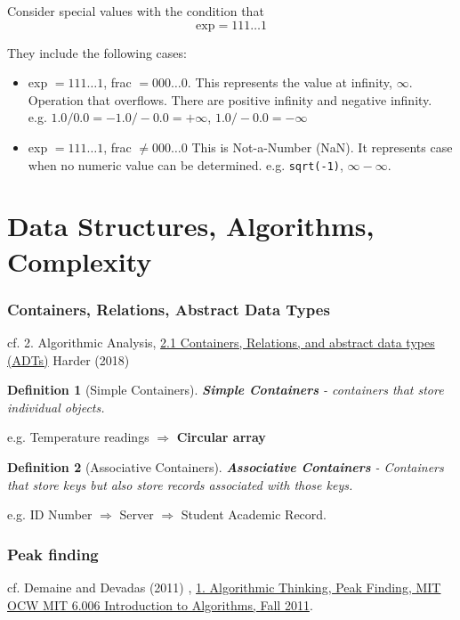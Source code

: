 \documentclass[10pt]{amsart}
\newtheorem{definition}{Definition}
\begin{document}
\begin{multicols*}{2}
Consider special values with the condition that 
\[
\text{exp} = 111\dots 1
\]

They include the following cases: 
\begin{itemize}
	\item exp $ = 111\dots 1$, frac $= 000 \dots 0$. This represents the value at infinity, $\infty$. Operation that overflows. There are positive infinity and negative infinity. \\
	e.g. $1.0/0.0 = -1.0/-0.0 = +\infty$, $1.0/-0.0 = -\infty$
	\item exp $ = 111\dots 1$, frac $\neq 000\dots 0$ This is Not-a-Number (NaN). It represents case when no numeric value can be determined. e.g. \verb|sqrt(-1)|, $\infty - \infty$.
\end{itemize}


\part{Data Structures, Algorithms, Complexity}

\section{Containers, Relations, Abstract Data Types}

cf. 2. Algorithmic Analysis, \href{https://ece.uwaterloo.ca/~dwharder/aads/Lecture_materials/2.01.Containers_relations_ADTs.pptx}{2.1 Containers, Relations, and abstract data types (ADTs)} Harder (2018) \cite{Hard2018}

\begin{definition}[Simple Containers]
	\textbf{Simple Containers} - containers that store individual objects.
\end{definition} 
e.g. Temperature readings $\Longrightarrow$ \textbf{Circular array}

\begin{definition}[Associative Containers]
\textbf{Associative Containers} - Containers that store keys but also store records associated with those keys.
\end{definition} 
e.g. ID Number $\Longrightarrow $ Server $\Longrightarrow$ Student Academic Record.



\section{Peak finding}

cf. Demaine and Devadas (2011) \cite{DeDe2001}, \href{https://youtu.be/HtSuA80QTyo}{1. Algorithmic Thinking, Peak Finding, MIT OCW MIT 6.006 Introduction to Algorithms, Fall 2011}. 


\end{multicols*}
\end{document}
